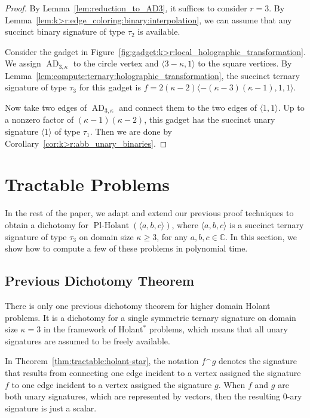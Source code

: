 \documentclass[11pt]{article}
\newcommand{\PlHolant}{\operatorname{Pl-Holant}}
\newcommand{\AD}{\operatorname{AD}}
\begin{document}
\begin{proof}
 By Lemma~\ref{lem:reduction_to_AD3},
 it suffices to consider $r = 3$.
 By Lemma~\ref{lem:k>r:edge_coloring:binary:interpolation},
 we can assume that any succinct binary signature of type $\tau_2$ is available.
 
 Consider the gadget in Figure~\ref{fig:gadget:k>r:local_holographic_transformation}.
 We assign $\AD_{3,\kappa}$ to the circle vertex and $\langle 3 - \kappa, 1 \rangle$ to the square vertices.
 By Lemma~\ref{lem:compute:ternary:holographic_transformation},
 the succinct ternary signature of type $\tau_3$ for this gadget is $f = 2 (\kappa-2) \langle -(\kappa-3)(\kappa-1), 1, 1 \rangle$.
 
 Now take two edges of $\AD_{3,\kappa}$ and connect them to the two edges of $\langle 1,1 \rangle$.
 Up to a nonzero factor of $(\kappa - 1) (\kappa - 2)$,
 this gadget has the succinct unary signature $\langle 1 \rangle$ of type $\tau_1$.
 Then we are done by Corollary~\ref{cor:k>r:abb_unary_binaries}.
\end{proof}

\section{Tractable Problems} \label{sec:tractable}

In the rest of the paper,
we adapt and extend our previous proof techniques to obtain a dichotomy for $\PlHolant(\langle a,b,c \rangle)$,
where $\langle a,b,c \rangle$ is a succinct ternary signature of type $\tau_3$ on domain size $\kappa \ge 3$,
for any $a,b,c \in \mathbb{C}$.
In this section,
we show how to compute a few of these problems in polynomial time.

\subsection{Previous Dichotomy Theorem}

There is only one previous dichotomy theorem for higher domain Holant problems.
It is a dichotomy for a single symmetric ternary signature on domain size $\kappa = 3$ in the framework of Holant$^*$ problems,
which means that all unary signatures are assumed to be freely available.

In Theorem~\ref{thm:tractable:holant-star},
the notation $f ^\frown g$ denotes the signature that results from
connecting one edge incident to a vertex assigned the signature $f$ to one edge incident to a vertex assigned the signature $g$.
When $f$ and $g$ are both unary signatures,
which are represented by vectors,
then the resulting $0$-ary signature is just a scalar.
\end{document}
